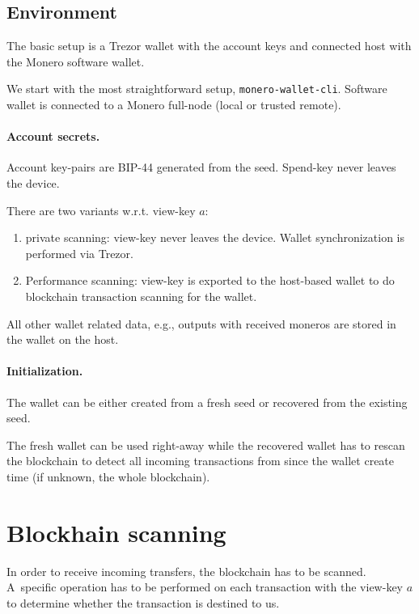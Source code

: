 \documentclass[]{article}
\begin{document}
\subsection{Environment}

The basic setup is a Trezor wallet with the account keys and connected host with the Monero software wallet.

We start with the most straightforward setup, \verb|monero-wallet-cli|. Software wallet is connected to a Monero full-node (local or trusted remote).

\paragraph{Account secrets.}
Account key-pairs are BIP-44 generated from the seed. Spend-key never leaves the device.

There are two variants w.r.t. view-key $a$:

\begin{enumerate}
	\item private scanning: view-key never leaves the device. Wallet synchronization is performed via Trezor. 
	\item Performance scanning: view-key is exported to the host-based wallet to do blockchain transaction scanning for the wallet.
\end{enumerate}

All other wallet related data, e.g., outputs with received moneros are
stored in the wallet on the host. 

\paragraph{Initialization.} The wallet can be either created from a fresh seed or recovered from the existing seed.

The fresh wallet can be used right-away while the recovered wallet has to rescan the blockchain to detect all incoming transactions from since the wallet create time (if unknown, the whole blockchain).

\section{Blockhain scanning}

In order to receive incoming transfers, the blockchain has to be scanned. A~specific operation has to be performed on each transaction with the view-key $a$ to determine whether the transaction is destined to us.
\end{document}
